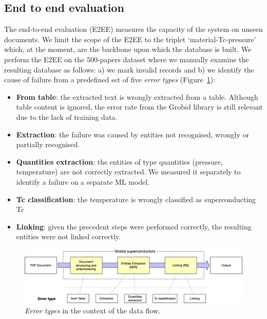 \documentclass[]{interact}
\theoremstyle{plain}%
\theoremstyle{definition}
\theoremstyle{remark}
\begin{document}
\subsection{End to end evaluation}

The end-to-end evaluation (E2EE) measures the capacity of the system on unseen documents.
We limit the scope of the E2EE to the triplet `material-Tc-pressure' which, at the moment, are the backbone upon which the database is built.
We perform the E2EE on the 500-papers dataset where we manually examine the resulting database as follows: a) we mark invalid records and b) we identify the cause of failure from a predefined set of five \textit{error types} (Figure~\ref{fig:error-types}):
\begin{itemize}
    \item \textbf{From table}: the extracted text is wrongly extracted from a table. Although table content is ignored, the error rate from the Grobid library is still relevant due to the lack of training data.
    \item \textbf{Extraction}: the failure was caused by entities not recognised, wrongly or partially recognised.
    \item \textbf{Quantities extraction}: the entities of type quantities (pressure, temperature) are not correctly extracted. We measured it separately to identify a failure on a separate ML model.
    \item \textbf{Tc classification}: the temperature is wrongly classified as superconducting Tc
    \item \textbf{Linking}: given the precedent steps were performed correctly, the resulting entities were not linked correctly.
\end{itemize}

\begin{figure}[ht]
    \centering
    \includegraphics[width=\textwidth]{error-types-colors}
    \caption{\textit{Error types} in the context of the data flow. }
    \label{fig:error-types}
\end{figure}
\end{document}
